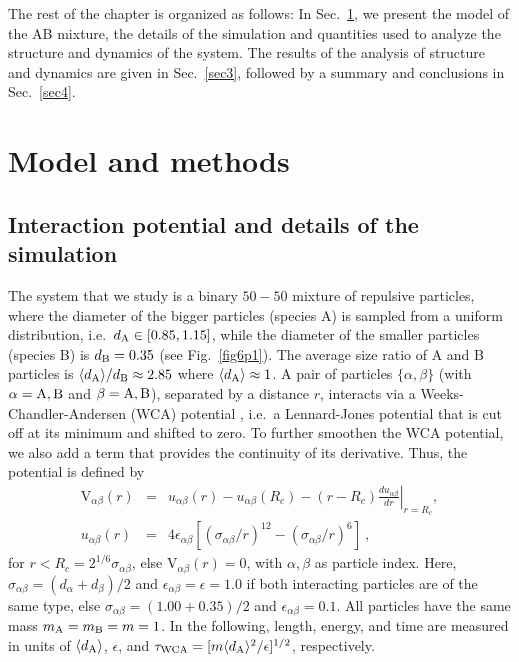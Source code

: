 The rest of the chapter is organized as follows: In Sec.~\ref{sec2}, we present the model of the AB mixture, the details of the simulation and quantities used to analyze the structure and dynamics of the system. The results of the analysis of structure and dynamics are given in Sec.~\ref{sec3}, followed by a summary and conclusions in Sec.~\ref{sec4}.   

%
\section{Model and methods}
\label{sec2}
%

%
\subsection{Interaction potential and details of the simulation}
%
The system that we study \cite{horbach2009} is a binary $50-50$ mixture of repulsive particles, where the diameter of the bigger particles (species A) is sampled from a uniform distribution, i.e.~$d_{\rm A} \in [0.85,1.15]$, while the diameter of the smaller particles (species B) is $d_{\rm B} = 0.35$ (see Fig.~\ref{fig6p1}). The average size ratio of A and B particles is $\langle d_{\rm A}\rangle/d_{\rm B} \approx 2.85$ where $\langle d_{\rm A}\rangle \approx 1$. A pair of particles $\{\alpha,\beta\}$ (with $\alpha = {\rm A, B}$ and $\beta = {\rm A, B}$), separated by a distance $r$, interacts via a Weeks-Chandler-Andersen (WCA) potential \cite{weeks1971}, i.e.~a Lennard-Jones potential that is cut off at its minimum and shifted to zero. To further smoothen the WCA potential, we also add a term that provides the continuity of its derivative. Thus, the potential is defined by 
%
\begin{eqnarray}
\textrm{V}_{\alpha\beta}(r) &=& u_{\alpha\beta}(r)-u_{\alpha\beta}(R_{c})-\left(r-R_{c}\right)\left.  \frac{du_{\alpha\beta}}{dr}\right|_{r=R_{c}},\nonumber\\
u_{\alpha\beta}(r) &=& 4\epsilon_{\alpha\beta}\left[\left(\sigma_{\alpha\beta}/r\right)^{12}- \left(\sigma_{\alpha\beta}/r\right)^{6}\right]\: ,
\end{eqnarray}
%
for $r<R_{c} = 2^{1/6} \sigma_{\alpha\beta}$, else $\textrm{V}_{\alpha\beta}(r) = 0$, with $\alpha, \beta$ as particle index. Here, $\sigma_{\alpha\beta} = (d_{\alpha}+d_{\beta})/2$ and $\epsilon_{\alpha\beta} = \epsilon = 1.0$ if both interacting particles are of the same type, else $\sigma_{\alpha\beta} = (1.00+0.35)/2$ and $\epsilon_{\alpha\beta} = 0.1$.  All particles have the same mass $m_{\rm A} = m_{\rm B} = m = 1$.  In the following, length, energy, and time are measured in units of $\langle d_{\rm A} \rangle$, $\epsilon$, and $\tau_{\rm WCA} = [m \langle d_{\rm A} \rangle ^2/\epsilon]^{1/2}$, respectively.

